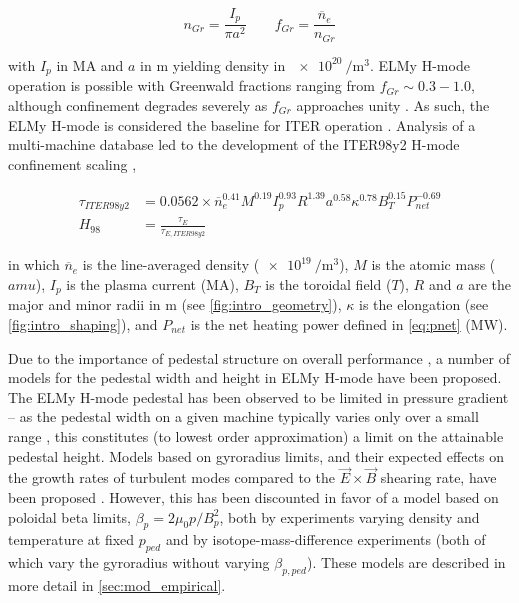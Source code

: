 \begin{equation}\label{eq:GDL}
  n_{Gr} = \frac{I_p}{\pi a^2} \qquad f_{Gr} = \frac{\overline{n}_e}{n_{Gr}}
\end{equation}

\noindent with $I_p$ in $\si{\mega\ampere}$ and $a$ in $\si{\meter}$ yielding density in $\SI{e20}{\per\meter\cubed}$.  ELMy H-mode operation is possible with Greenwald fractions ranging from $f_{Gr} \sim 0.3-1.0$, although confinement degrades severely as $f_{Gr}$ approaches unity \cite{Saibene1999}.  As such, the ELMy H-mode is considered the baseline for ITER operation \cite{ITER1999,Shimada2007}.  Analysis of a multi-machine database \cite{Christiansen1992} led to the development of the ITER98y2 H-mode confinement scaling \cite{ITER1999},

\begin{align}
 \tau_{ITER98y2} &= 0.0562 \times \overline{n}_e^{0.41} M^{0.19} I_p^{0.93} R^{1.39} a^{0.58} \kappa^{0.78} B_T^{0.15} P_{net}^{-0.69}\label{eq:tau98}\\
 H_{98} &= \frac{\tau_E}{\tau_{E,ITER98y2}}\label{eq:H98}
\end{align}

\noindent in which $\overline{n}_e$ is the line-averaged density ($\SI{e19}{\per\meter\cubed}$), $M$ is the atomic mass ($\si{amu}$), $I_p$ is the plasma current ($\si{\mega\ampere}$), $B_T$ is the toroidal field ($\si{T}$), $R$ and $a$ are the major and minor radii in $\si{\meter}$ (see \cref{fig:intro_geometry}), $\kappa$ is the elongation (see \cref{fig:intro_shaping}), and $P_{net}$ is the net heating power defined in \cref{eq:pnet} ($\si{\mega\watt}$).

Due to the importance of pedestal structure on overall performance \cite{Kinsey2011}, a number of models for the pedestal width and height in ELMy H-mode have been proposed.  The ELMy H-mode pedestal has been observed to be limited in pressure gradient \cite{Connor1998,Urano2003} -- as the pedestal width on a given machine typically varies only over a small range \cite{Maggi2010,Schneider2013}, this constitutes (to lowest order approximation) a limit on the attainable pedestal height.  Models based on gyroradius limits, and their expected effects on the growth rates of turbulent modes compared to the $\vec{E}\times\vec{B}$ shearing rate, have been proposed \cite{Groebner1998a,Beurskens2011}.  However, this has been discounted in favor of a model based on poloidal beta limits, $\beta_p = 2\mu_0 p/B_p^2$, both by experiments varying density and temperature at fixed $p_{ped}$ \cite{Osborne1998} and by isotope-mass-difference experiments \cite{Urano2008} (both of which vary the gyroradius without varying $\beta_{
p,ped}$).  These models are described in more detail in \cref{sec:mod_empirical}.

